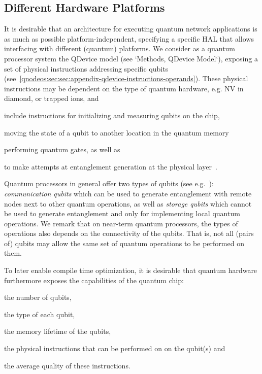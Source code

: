 \subsection{Different Hardware Platforms} 

It is desirable that an architecture for executing quantum network applications is as much as possible platform-independent, specifying a specific \ac{HAL} that allows interfacing with different (quantum) platforms. We consider as a quantum processor system the \ac{QDevice} model (see `Methods, QDevice Model`), exposing a set of physical instructions addressing specific qubits (see~\cref{qnodeos:sec:sec:appendix-qdevice-instructions-operands}). These physical instructions may be dependent on the type of quantum hardware, e.g. NV in diamond, or trapped ions, and
%
\begin{inlinelist}
\item include instructions for initializing and measuring qubits on the chip,
\item moving the state of a qubit to another location in the quantum memory
\item performing quantum gates, as well as
\item to make attempts at entanglement generation at the physical layer~\cite{pompili_2022_experimental}.
\end{inlinelist}

Quantum processors in general offer two types of qubits (see e.g.~\cite{dahlberg_2019_egp}): \emph{communication qubits} which can be used to generate entanglement with remote nodes next to other quantum operations, as well as \emph{storage qubits} which cannot be used to generate entanglement and only for implementing local quantum operations. We remark that on near-term quantum processors, the types of operations also depends on the connectivity of the qubits. That is, not all (pairs of) qubits may allow the same set of quantum operations to be performed on them.

To later enable compile time optimization, it is desirable that quantum hardware furthermore exposes the capabilities of the quantum chip:
%
\begin{inlinelist}
\item the number of qubits,
\item the type of each qubit, 
\item the memory lifetime of the qubits,
\item the physical instructions that can be performed on on the qubit(s) and
\item the average quality of these instructions.
\end{inlinelist}

